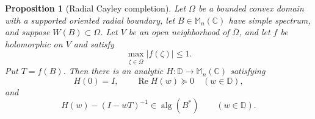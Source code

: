 \documentclass[preprints,article,submit,oneauthor]{Definitions/mdpi}
\newcounter{manuscriptresult}[section]
\theoremstyle{mdpi}
\newtheorem{proposition}[manuscriptresult]{Proposition}
\theoremstyle{definition}
\newcommand{\C}{\mathbb C}
\newcommand{\D}{\mathbb D}
\newcommand{\Mn}{\mathbb M_n(\C)}
\newcommand{\alg}{\operatorname{alg}}
\newcommand{\RePart}{\operatorname{Re}}
\begin{document}
\begin{proposition}[Radial Cayley completion]
\label{prop:cayley-completion}
Let $\Omega$ be a bounded convex domain with a supported oriented
radial boundary, let $B\in\Mn$ have simple spectrum, and suppose
$W(B)\subset\Omega$.  Let $V$ be an open neighborhood of
$\overline\Omega$, and let $f$ be holomorphic on $V$ and satisfy
\begin{equation}
  \max_{\zeta\in\overline\Omega}\lvert f(\zeta)\rvert\leq1.
  \label{eq:f-bounded-by-one}
\end{equation}
Put $T=f(B)$.  Then there is an analytic $H\colon\D\to\Mn$ satisfying
\begin{equation}
  H(0)=I,\qquad \RePart H(w)\succeq0\quad(w\in\D),
  \label{eq:cayley-H-positive}
\end{equation}
and
\begin{equation}
  H(w)-(I-wT)^{-1}\in\alg(B^*)\qquad(w\in\D).
  \label{eq:cayley-H-completion}
\end{equation}
\end{proposition}
\end{document}
